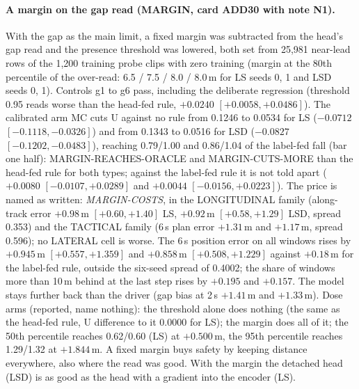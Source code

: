 \paragraph{A margin on the gap read (MARGIN, card ADD30 with note N1).} With the gap as the main limit, a fixed margin was subtracted from the head's gap read and the presence threshold was lowered, both set from 25,981 near-lead rows of the 1,200 training probe clips with zero training (margin at the 80th percentile of the over-read: 6.5 / 7.5 / 8.0 / 8.0\,m for LS seeds 0, 1 and LSD seeds 0, 1). Controls g1 to g6 pass, including the deliberate regression (threshold 0.95 reads worse than the head-fed rule, $+0.0240$ $[+0.0058,+0.0486]$). The calibrated arm MC cuts U against no rule from 0.1246 to 0.0534 for LS ($-0.0712$ $[-0.1118,-0.0326]$) and from 0.1343 to 0.0516 for LSD ($-0.0827$ $[-0.1202,-0.0483]$), reaching 0.79/1.00 and 0.86/1.04 of the label-fed fall (bar one half): MARGIN-REACHES-ORACLE and MARGIN-CUTS-MORE than the head-fed rule for both types; against the label-fed rule it is not told apart ($+0.0080$ $[-0.0107,+0.0289]$ and $+0.0044$ $[-0.0156,+0.0223]$). The price is named as written: \emph{MARGIN-COSTS}, in the LONGITUDINAL family (along-track error $+0.98$\,m $[+0.60,+1.40]$ LS, $+0.92$\,m $[+0.58,+1.29]$ LSD, spread 0.353) and the TACTICAL family (6\,s plan error $+1.31$\,m and $+1.17$\,m, spread 0.596); no LATERAL cell is worse. The 6\,s position error on all windows rises by $+0.945$\,m $[+0.557,+1.359]$ and $+0.858$\,m $[+0.508,+1.229]$ against $+0.18$\,m for the label-fed rule, outside the six-seed spread of 0.4002; the share of windows more than 10\,m behind at the last step rises by $+0.195$ and $+0.157$. The model stays further back than the driver (gap bias at 2\,s $+1.41$\,m and $+1.33$\,m). Dose arms (reported, name nothing): the threshold alone does nothing (the same as the head-fed rule, U difference to it 0.0000 for LS); the margin does all of it; the 50th percentile reaches 0.62/0.60 (LS) at $+0.500$\,m, the 95th percentile reaches 1.29/1.32 at $+1.844$\,m. A fixed margin buys safety by keeping distance everywhere, also where the read was good. With the margin the detached head (LSD) is as good as the head with a gradient into the encoder (LS).

